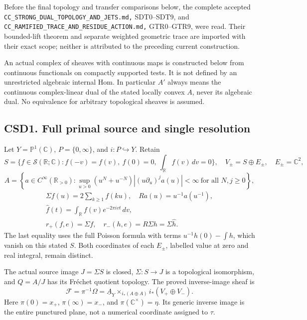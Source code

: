 Before the final topology and transfer comparisons below, the complete
accepted \nolinkurl{CC_STRONG_DUAL_TOPOLOGY_AND_JETS.md,} SDT0--SDT9,
and \nolinkurl{CC_RAMIFIED_TRACE_AND_RESIDUE_ACTION.md,} GTR0--GTR9,
were read. Their bounded-lift theorem and separate weighted geometric
trace are imported with their exact scope; neither is attributed to the
preceding current construction.

An actual complex of sheaves with continuous maps is constructed below
from continuous functionals on compactly supported tests. It is not
defined by an unrestricted algebraic internal Hom. In particular \(A'\)
always means the continuous complex-linear dual of the stated locally
convex \(A\), never its algebraic dual. No equivalence for arbitrary
topological sheaves is assumed.

\subsection{CSD1. Full primal source and single
resolution}\label{csd1.-full-primal-source-and-single-resolution}

Let \(Y=\mathbb P^1(\mathbb C)\), \(P=\{0,\infty\}\), and
\(i:P\hookrightarrow Y\). Retain \[
S=\{f\in\mathcal S(\mathbb R;\mathbb C):f(-v)=f(v),\
f(0)=0,\ \int_{\mathbb R}f(v)\,dv=0\},\quad
V_\pm=S\oplus E_\pm,\quad E_\pm=\mathbb C^2,
\] \[
A=\left\{a\in C^\infty(\mathbb R_{>0}):
\sup_{u>0}(u^N+u^{-N})|(u\partial_u)^ja(u)|<\infty\
\text{for all }N,j\ge0\right\},
\] \[
\begin{gathered}
\Sigma f(u)=2\sum_{k\ge1}f(ku),\quad
Ra(u)=u^{-1}a(u^{-1}),\\
\widehat f(t)=\int_{\mathbb R}f(v)e^{-2\pi ivt}\,dv,\\
r_+(f,e)=\Sigma f,\quad r_-(h,e)=R\Sigma h=\Sigma\widehat h.
\end{gathered}
\tag{CSD1.1}
\] The last equality uses the full Poisson formula with terms
\(u^{-1}h(0)-\int h\), which vanish on this stated \(S\). Both
coordinates of each \(E_\pm\), labelled value at zero and real integral,
remain distinct.

The actual source image \(J=\Sigma S\) is closed, \(\Sigma:S\to J\) is a
topological isomorphism, and \(Q=A/J\) has its Fréchet quotient
topology. The proved inverse-image sheaf is \[
\mathscr F=\pi^{-1}\Omega
=\underline A_Y\times_{i_*(A\oplus A)}i_*(V_+\oplus V_-).
\tag{CSD1.2}
\] Here \(\pi(0)=x_+\), \(\pi(\infty)=x_-\), and
\(\pi(\mathbb C^\times)=\eta\). Its generic inverse image is the entire
punctured plane, not a numerical coordinate assigned to \(\tau\).

